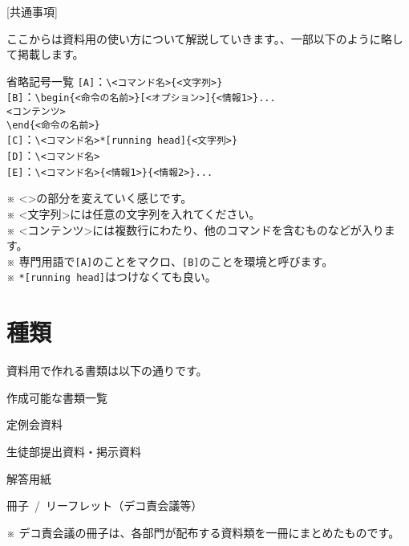\newpage
\pagestyle{booklet}
[共通事項]
\begin{multicols*}{2}
ここからは資料用\BunTeX の使い方について解説していきます。、一部以下のように略して掲載します。

\begin{framebox-simple}{省略記号一覧}
\noindent\verb|[A]|：\verb|\<コマンド名>{<文字列>}|\\
\noindent\verb|[B]|：\verb|\begin{<命令の名前>}[<オプション>]{<情報1>}...|\\\hspace{4.5\zw}\verb|<コンテンツ>|\\\hspace{2.4\zw}\verb|\end{<命令の名前>}|\\
\noindent\verb|[C]|：\verb|\<コマンド名>*[running head]{<文字列>}|\\
\noindent\verb|[D]|：\verb|\<コマンド名>|\\
\noindent\verb|[E]|：\verb|\<コマンド名>{<情報1>}{<情報2>}...|
\end{framebox-simple}
\noindent ※ <>の部分を変えていく感じです。\\
\noindent ※ <文字列>には任意の文字列を入れてください。\\
\noindent ※ <コンテンツ>には複数行にわたり、他のコマンドを含むものなどが入ります。\\
\noindent ※ 専門用語で\verb|[A]|のことをマクロ、\verb|[B]|のことを環境と呼びます。\\
\noindent ※ \verb|*[running head]|はつけなくても良い。

\section{種類}
資料用\BunTeX で作れる書類は以下の通りです。
\begin{framebox-simple}{作成可能な書類一覧}
    \begin{reitemize}
        \item 定例会資料
        \item 生徒部提出資料・掲示資料
        \item 解答用紙
        \item 冊子~/~リーフレット（デコ責会議等）
    \end{reitemize}
\end{framebox-simple}
\indent ※ デコ責会議の冊子は、各部門が配布する資料類を一冊にまとめたものです。


\end{multicols*}
